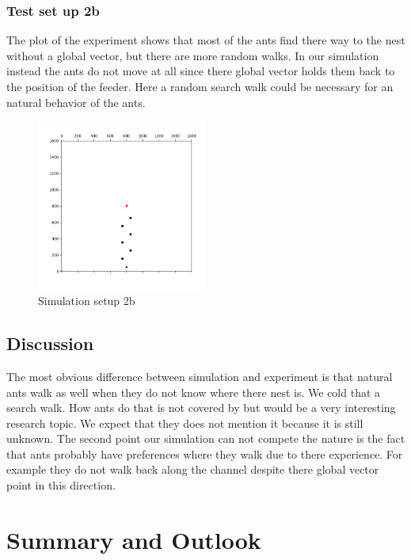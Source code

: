 \documentclass[11pt]{article}
\begin{document}
	\subsubsection{Test set up 2b}
The plot of the experiment shows that most of the ants find there way to the nest without a global vector, but there are more random walks. 
In our simulation instead the ants do not move at all since there global vector holds them back to the position of the feeder. Here a random search walk could be necessary for an natural behavior of the ants. 

\begin{figure}[H]
	\centering
	\includegraphics[width=0.5\textwidth]{test_2b.png}
	\caption{Simulation setup 2b}
	\label{fig:2b}
\end{figure}

	\subsection{Discussion}
		The most obvious difference between simulation and experiment is that natural ants walk as well when they do not know where there nest is. We cold that a search walk. How ants do that is not covered by \cite{wehner} but would  be a very interesting research topic. We expect that they does not mention it because it is still unknown. The second point our simulation can not compete the nature is the fact that ants probably have preferences where they walk due to there experience. For example they do not walk back along the channel despite there global vector point in this direction. 

\section{Summary and Outlook} %
\end{document}
